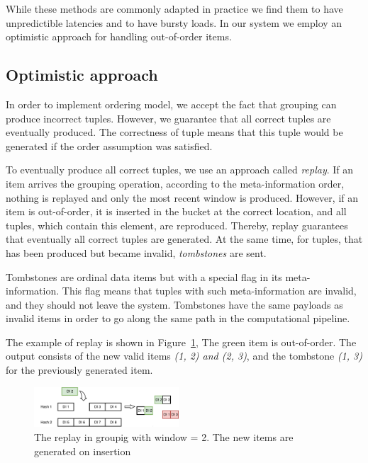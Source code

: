 While these methods are commonly adapted in practice we find them to have unpredictible latencies and to have bursty loads. In our system we employ an optimistic approach for handling out-of-order items.

\subsection{Optimistic approach}

In order to implement ordering model, we accept the fact that grouping can produce incorrect tuples. However, we guarantee that all correct tuples are eventually produced. The correctness of tuple means that this tuple would be generated if the order assumption was satisfied. 

To eventually produce all correct tuples, we use an approach called {\it replay}. If an item arrives the grouping operation, according to the meta-information order, nothing is replayed and only the most recent window is produced. However, if an item is out-of-order, it is inserted in the bucket at the correct location, and all tuples, which contain this element, are reproduced. Thereby, replay guarantees that eventually all correct tuples are generated. At the same time, for tuples, that has been produced but became invalid, {\it tombstones} are sent.

Tombstones are ordinal data items but with a special flag in its meta-information. This flag means that tuples with such meta-information are invalid, and they should not leave the system. Tombstones have the same payloads as invalid items in order to go along the same path in the computational pipeline.

The example of replay is shown in Figure~\ref{grouping-replaying}, The green item is out-of-order. The output consists of the new valid items {\it (1, 2) and (2, 3)}, and the tombstone {\it (1, 3)} for the previously generated item.

\begin{figure}[htbp]
  \centering
  \includegraphics[width=0.48\textwidth]{pics/grouping-replaying}
  \caption{The replay in groupig with window = 2. The new items are generated on insertion}
  \label {grouping-replaying}
\end{figure}

